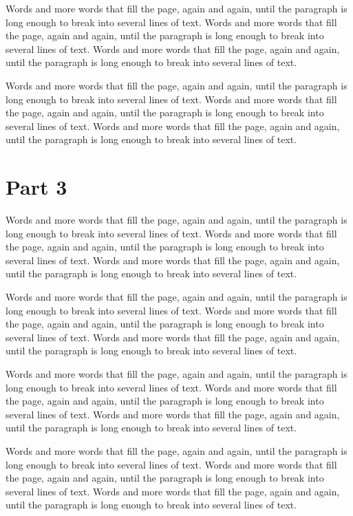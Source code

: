 \documentclass{article}
\begin{document}
Words and more words that fill the page, again and again, until the paragraph is long enough to break into several lines of text. Words and more words that fill the page, again and again, until the paragraph is long enough to break into several lines of text. Words and more words that fill the page, again and again, until the paragraph is long enough to break into several lines of text. 

Words and more words that fill the page, again and again, until the paragraph is long enough to break into several lines of text. Words and more words that fill the page, again and again, until the paragraph is long enough to break into several lines of text. Words and more words that fill the page, again and again, until the paragraph is long enough to break into several lines of text. 

\section{Part 3}
Words and more words that fill the page, again and again, until the paragraph is long enough to break into several lines of text. Words and more words that fill the page, again and again, until the paragraph is long enough to break into several lines of text. Words and more words that fill the page, again and again, until the paragraph is long enough to break into several lines of text. 

Words and more words that fill the page, again and again, until the paragraph is long enough to break into several lines of text. Words and more words that fill the page, again and again, until the paragraph is long enough to break into several lines of text. Words and more words that fill the page, again and again, until the paragraph is long enough to break into several lines of text. 

Words and more words that fill the page, again and again, until the paragraph is long enough to break into several lines of text. Words and more words that fill the page, again and again, until the paragraph is long enough to break into several lines of text. Words and more words that fill the page, again and again, until the paragraph is long enough to break into several lines of text. 

Words and more words that fill the page, again and again, until the paragraph is long enough to break into several lines of text. Words and more words that fill the page, again and again, until the paragraph is long enough to break into several lines of text. Words and more words that fill the page, again and again, until the paragraph is long enough to break into several lines of text. 
\end{document}
